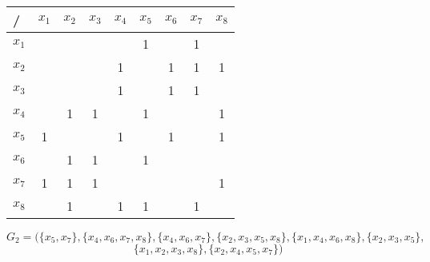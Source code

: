 \documentclass[12pt]{article}
\begin{document}
\begin{enumerate}
\begin{tabular}{|l|c|c|c|c|c|c|c|c|}
\hline
/     & \multicolumn{1}{l|}{$x_1$} & \multicolumn{1}{l|}{$x_2$} & \multicolumn{1}{l|}{$x_3$} & \multicolumn{1}{l|}{$x_4$} & \multicolumn{1}{l|}{$x_5$} & \multicolumn{1}{l|}{$x_6$} & \multicolumn{1}{l|}{$x_7$} & \multicolumn{1}{l|}{$x_8$} \\ \hline
$x_1$ &                            &                            &                            &                            & 1                          &                            & 1                          &                            \\ \hline
$x_2$ &                            &                            &                            & 1                          &                            & 1                          & 1                          & 1                          \\ \hline
$x_3$ &                            &                            &                            & 1                          &                            & 1                          & 1                          &                            \\ \hline
$x_4$ &                            & 1                          & 1                          &                            & 1                          &                            &                            & 1                          \\ \hline
$x_5$ & 1                          &                            &                            & 1                          &                            & 1                          &                            & 1                          \\ \hline
$x_6$ &                            & 1                          & 1                          &                            & 1                          &                            &                            &                            \\ \hline
$x_7$ & 1                          & 1                          & 1                          &                            &                            &                            &                            & 1                          \\ \hline
$x_8$ &                            & 1                          &                            & 1                          & 1                          &                            & 1                          &                            \\ \hline
\end{tabular}
\begin{equation*}
    G_2 = (\{x_5,x_7\},\{x_4,x_6,x_7,x_8\},\{x_4,x_6,x_7\},\{x_2,x_3,x_5,x_8\},\{x_1,x_4,x_6,x_8\},\{x_2,x_3,x_5\},
\end{equation*}
\begin{equation*}
    \{x_1,x_2,x_3,x_8\},\{x_2,x_4,x_5,x_7\})
\end{equation*}


\end{enumerate}
\end{document}
